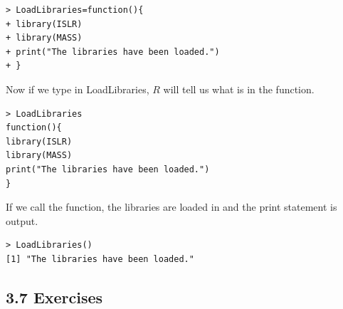\documentclass[10pt]{article}
\begin{document}
\begin{verbatim}
> LoadLibraries=function(){
+ library(ISLR)
+ library(MASS)
+ print("The libraries have been loaded.")
+ }
\end{verbatim}

Now if we type in LoadLibraries, $R$ will tell us what is in the function.

\begin{verbatim}
> LoadLibraries
function(){
library(ISLR)
library(MASS)
print("The libraries have been loaded.")
}
\end{verbatim}

If we call the function, the libraries are loaded in and the print statement is output.

\begin{verbatim}
> LoadLibraries()
[1] "The libraries have been loaded."
\end{verbatim}

\subsection*{3.7 Exercises}
\end{document}
